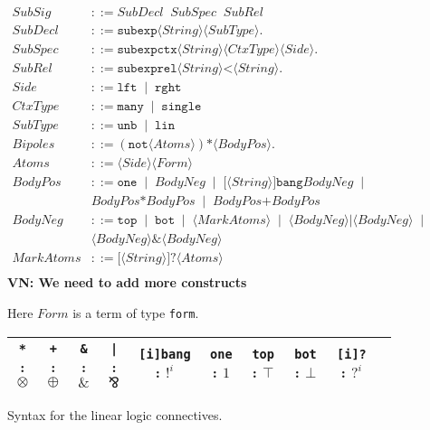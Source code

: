 \documentclass{llncs}
\newcommand{\tup}[1]{\langle#1\rangle}
\begin{document}
\begin{figure}[t]
\begin{align*}
SubSig &::= SubDecl \;\; SubSpec \;\; SubRel \\
SubDecl &::= \texttt{subexp} \tup{String} \tup{SubType}.\\
SubSpec &::= \texttt{subexpctx} \tup{String} \tup{CtxType} \tup{Side}.\\
SubRel &::= \texttt{subexprel} \tup{String} \texttt{<} \tup{String}. \\
Side &::= \texttt{lft} \;\;|\;\; \texttt{rght} \\
CtxType &::=  \texttt{many} \;\;|\;\; \texttt{single} \\
SubType &::=  \texttt{unb} \;\;|\;\; \texttt{lin} \\
Bipoles &::= (\texttt{not} \tup{Atoms}) \texttt{*} \tup{BodyPos}. \\
Atoms &::= \tup{Side} \tup{Form} \\
BodyPos &::= \texttt{one} \;\;|\;\; BodyNeg \;\;|\;\; \texttt{[}\tup{String}\texttt{]bang} BodyNeg \;\;|\;\;\\ 
        & BodyPos \texttt{*} BodyPos \;\;|\;\; BodyPos \texttt{+} BodyPos \\
BodyNeg &::= \texttt{top} \;\;|\;\; \texttt{bot} \;\;|\;\; \tup{MarkAtoms} \;\;|\;\; \tup{BodyNeg}|\tup{BodyNeg} \;\;|\;\; \\
        & \tup{BodyNeg} \texttt{\&} \tup{BodyNeg}\\
MarkAtoms &::= \texttt{[}\tup{String}\texttt{]?} \tup{Atoms} \\
\end{align*}
\textbf{VN: We need to add more constructs}
\caption{Here $Form$ is a term of type \texttt{form}.} 
\label{fig:syntax}
\begin{center}
\begin{tabular}{c@{\quad}c@{\quad}c@{\quad}c@{\quad}c@{\quad}c@{\quad}c@{\quad}c@{\quad}c@{\quad}c}
\toprule
\texttt{*} : $\otimes$ & \texttt{+} : $\oplus$ & \texttt{\&} : $\&$ & \texttt{|} : $\bindnasrepma$ & \texttt{[i]bang} : $!^i$ &
\texttt{one} : $1$ &  \texttt{top} : $\top$ & \texttt{bot} : $\bot$ & \texttt{[i]?} : $?^i$ \\
\bottomrule
\end{tabular}
\end{center}
\caption{Syntax for the linear logic connectives.}
\label{fig:syntax_ll}
\end{figure}
\end{document}
